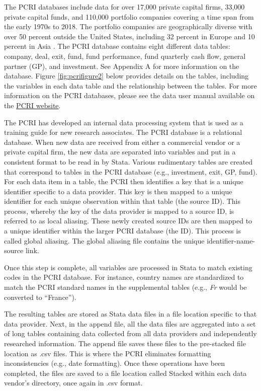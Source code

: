 The PCRI databases include data for over 17,000 private capital firms, 33,000 private capital funds, and 110,000 portfolio companies covering a time span from the early 1970s to 2018. The portfolio companies are geographically diverse with over 50 percent outside the United States, including 32 percent in Europe and 10 percent in Asia \citep{jeng2015}. The PCRI database contains eight different data tables: company, deal, exit, fund, fund performance, fund quarterly cash flow, general partner (GP), and investment. See Appendix A for more information on the database. Figure \ref{fig:pcrifigure2} below provides details on the tables, including the variables in each data table and the relationship between the tables. For more information on the PCRI databases, please see the data user manual available on the \href{http://privatecapitalresearchinstitute.org/images/news/pcri_manual_2_4.pdf}{PCRI website}.



The PCRI has developed an internal data processing system that is used as a training guide for new research associates. The PCRI database is a relational database. When new data are received from either a commercial vendor or a private capital firm, the new data are separated into variables and put in a consistent format to be read in by Stata. Various rudimentary tabl­es are created that correspond to tables in the PCRI database (e.g., investment, exit, GP, fund). For each data item in a table, the PCRI then identifies a key that is a unique identifier specific to a data provider. This key is then mapped to a unique identifier for each unique observation within that table (the source ID). This process, whereby the key of the data provider is mapped to a source ID, is referred to as local aliasing. These newly created source IDs are then mapped to a unique identifier within the larger PCRI database (the ID). This process is called global aliasing. The global aliasing file contains the unique identifier-name-source link.

Once this step is complete, all variables are processed in Stata to match existing codes in the PCRI database. For instance, country names are standardized to match the PCRI standard names in the supplemental tables (e.g., \emph{Fr} would be converted to ``France'').

The resulting tables are stored as Stata data files in a file location specific to that data provider. Next, in the append file, all the data files are aggregated into a set of long tables containing data collected from all data providers and independently researched information. The append file saves these files to the pre-stacked file location as .csv files. This is where the PCRI eliminates formatting inconsistencies (e.g., date formatting). Once these operations have been completed, the files are saved to a file location called Stacked within each data vendor's directory, once again in .csv format.


